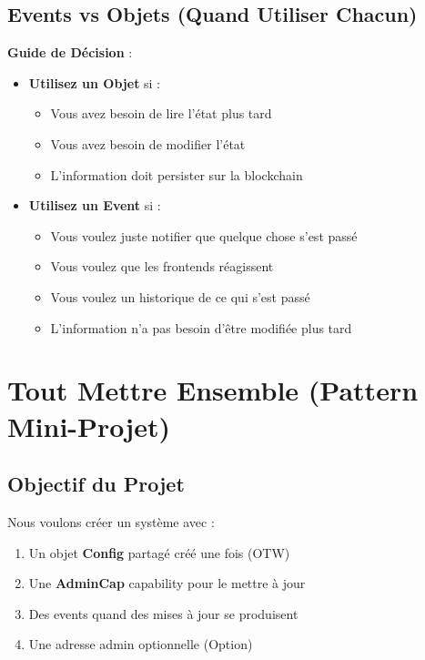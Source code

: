 \documentclass[11pt]{article}
\begin{document}
\subsection{Events vs Objets (Quand Utiliser Chacun)}

\begin{explainBox}
\textbf{Guide de Décision} :
\begin{itemize}
  \item \textbf{Utilisez un Objet} si :
  \begin{itemize}
    \item Vous avez besoin de lire l'état plus tard
    \item Vous avez besoin de modifier l'état
    \item L'information doit persister sur la blockchain
  \end{itemize}
  
  \item \textbf{Utilisez un Event} si :
  \begin{itemize}
    \item Vous voulez juste notifier que quelque chose s'est passé
    \item Vous voulez que les frontends réagissent
    \item Vous voulez un historique de ce qui s'est passé
    \item L'information n'a pas besoin d'être modifiée plus tard
  \end{itemize}
\end{itemize}
\end{explainBox}

\section{Tout Mettre Ensemble (Pattern Mini-Projet)}

\subsection{Objectif du Projet}

Nous voulons créer un système avec :
\begin{enumerate}
  \item Un objet \textbf{Config} partagé créé une fois (OTW)
  \item Une \textbf{AdminCap} capability pour le mettre à jour
  \item Des events quand des mises à jour se produisent
  \item Une adresse admin optionnelle (Option)
\end{enumerate}
\end{document}
